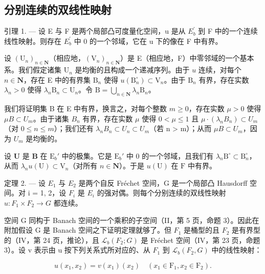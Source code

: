 \subsection{分别连续的双线性映射}

引理 1. --- 设 E 与 F 是两个局部凸可度量化空间，u 是从 \(E_{b}^{\prime}\) 到 F 中的一个连续线性映射。则存在 \(E_{b}^{\prime}\) 中 0 的一个邻域，它在 u 下的像在 F 中有界。

设 \((\mathrm{U}_n)_{n\in \mathbf{N}}\)（相应地，\((\mathrm{V}_n)_{n\in \mathbf{N}}\)）是 E（相应地，F）中零邻域的一个基本系。我们假定诸集 \(\mathrm{U}_n\) 是均衡的且构成一个递减序列。由于 \(u\) 连续，对每个 \(n\in \mathbf{N}\)，存在 E 中的有界集 \(\mathrm{B}_n\) 使得 \(u(\mathrm{B}_n^\circ)\subset \mathrm{V}_n\)。由于 \(\mathrm{B}_n\) 有界，存在实数 \(\lambda_n > 0\) 使得 \(\lambda_{n}\mathrm{B}_{n}\subset \mathrm{U}_{n}\)。令 \(\mathrm{B} = \bigcup_{n\in \mathbf{N}}\lambda_n\mathrm{B}_n\)。

我们将证明集 B 在 E 中有界，换言之，对每个整数 \(m \geqslant 0\)，存在实数 \(\mu > 0\) 使得 \(\mu B \subset U_{m}\)。由于诸集 \(B_{n}\) 有界，存在实数 \(\mu\) 使得 \(0 < \mu \leqslant 1\) 且 \(\mu \cdot (\lambda_{n} B_{n}) \subset U_{m}\)（对 \(0 \leqslant n \leqslant m\)）；我们还有 \(\lambda_{n} B_{n} \subset U_{n} \subset U_{m}\)（若 n \textgreater{} m）；从而 \(\mu B \subset U_{m}\)，因为 \(U_{m}\) 是均衡的。

设 \(\mathbf{U}\) 是 \(\mathbf{B}\) 在 \(\mathrm{E}_b'\) 中的极集。它是 \(\mathrm{E}_b'\) 中 0 的一个邻域，且我们有 \(\lambda_n\mathrm{B}^\circ \subset \mathrm{B}_n^\circ\)，从而 \(\lambda_n u(\mathrm{U}) \subset \mathrm{V}_n\)（对所有 \(n \in \mathbf{N}\)）。于是 \(u(\mathrm{U})\) 在 \(\mathrm{F}\) 中有界。

定理 2. --- 设 \(E_{1}\) 与 \(E_{2}\) 是两个自反 Fréchet 空间，G 是一个局部凸 Hausdorff 空间。对 i = 1, 2，设 \(F_{i}\) 是 \(E_{i}\) 的强对偶。则每个分别连续的双线性映射 \(u: F_{1} \times F_{2} \to G\) 都连续。

空间 G 同构于 Banach 空间的一个乘积的子空间（II，第 5 页，命题 3）。因此在附加假设 G 是 Banach 空间之下证明定理就够了。但 \(F_{1}\) 是桶型的且 \(F_{2}\) 是有界型的（IV，第 24 页，推论），且 \(\mathcal{L}_{b}(F_{2}; G)\) 是 Fréchet 空间（IV，第 23 页，命题 3）。设 v 表示由 u 按下列关系式所对应的、从 \(F_{1}\) 到 \(\mathcal{L}_{b}(F_{2}, G)\) 中的线性映射：

\[
u (x _ {1}, x _ {2}) = v (x _ {1}) \left(x _ {2}\right) \quad \left(x _ {1} \in \mathrm{F} _ {1}, x _ {2} \in \mathrm{F} _ {2}\right).
\]

